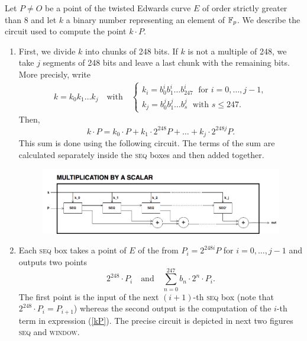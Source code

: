 
Let $P\not= O$ be a point of the twisted Edwards curve $E$ of order strictly greater than 8 and let $k$ a binary number representing an element of $\mathbb{F}_p$. We describe the circuit used to compute the point $k\cdot P$.

\begin{enumerate}
	
	\item First, we divide $k$ into chunks of 248 bits. If $k$ is not a multiple of 248, we take $j$ segments of 248 bits and leave a last chunk with the remaining bits. More precisly, write 
		\begin{gather*}
		k = k_0 k_1 \dots k_j 	\quad\text{with}\quad 
			\begin{cases}
			k_i = b^i_0 b^i_1 \dots b^i_{247} 	\;\text{ for }  i = 0, \dots, j-1, \\
			k_j = b^j_0 b^j_1 \dots b^j_s 	\;\text{ with } s\leq 247.
			\end{cases}
		\end{gather*}
	Then,  
		\begin{equation}
		\label{kP}
			k\cdot P = k_0\cdot P + k_1\cdot 2^{248}P +\dots+ k_j\cdot 2^{248j}P. 	
 		\end{equation}
	This sum is done using the following %
	circuit. %
	The terms of the sum are calculated separately inside the \textsc{seq} boxes and then added together. 

	\begin{figure}[h]
		\centering
		\includegraphics[scale=0.45]{Diag/Mult_by_scalar.png}
	\end{figure}
	
	\item Each \textsc{seq} box takes a point of $E$ of the from $P_i = 2^{248 i} P$ for $i=0,\dots,j-1$ and outputs two points %
		$$ 	
			2^{248} \cdot P_i 
			\quad \text{and} \quad
			\sum_{n = 0}^{247} b_n \cdot 2^{n} \cdot P_i. 
		$$
	The first point is the input of the next $(i+1)$-th \textsc{seq} box (note that $ 2^{248} \cdot P_i = P_{i+1}$) whereas the second output is the computation of the $i$-th term in expression (\ref{kP}). The precise circuit is depicted in next two figures \textsc{seq} and \textsc{window}.
	

\end{enumerate}
